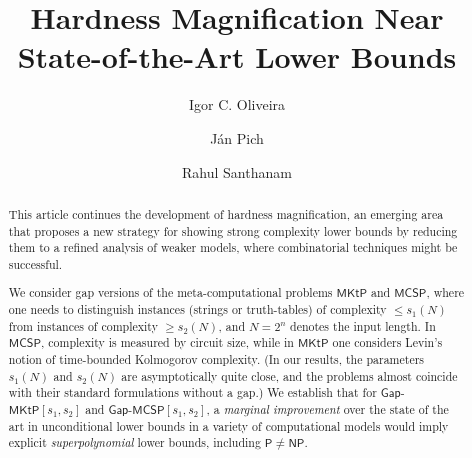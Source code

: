 \documentclass{toc}
\newcommand{\gapmktp}{\mathsf{Gap}$-$\mathsf{MKtP}}
\newcommand{\gapmcsp}{\mathsf{Gap}$-$\mathsf{MCSP}}
\begin{document}
\begin{frontmatter} %
  
%
%

%
%

  \title{Hardness Magnification Near State-of-the-Art Lower Bounds}

%
%
%
%
%
%
%
%
%
%
%
%


%
%
%
%

%

\author[oliveira]{Igor C. Oliveira}%
\author[pich]{J\'an Pich}%
\author[santhanam]{Rahul Santhanam}%


%
%
%
%

%
%
%
%
%
%


\begin{abstract}
%
%
This article continues the development of hardness magnification,
an emerging area that   %
proposes a new strategy for showing strong complexity lower bounds by reducing them to a refined analysis of weaker models, where combinatorial techniques might be successful. 

We consider gap versions of the meta-computational problems $\mathsf{MKtP}$ and $\mathsf{MCSP}$, where one needs to distinguish instances (strings or truth-tables) of complexity $\leq s_1(N)$ from instances of complexity $\geq s_2(N)$, and $N = 2^n$ denotes the input length. In $\mathsf{MCSP}$, complexity is measured by circuit size, while in $\mathsf{MKtP}$ one considers Levin's notion of time-bounded Kolmogorov complexity. (In our results, the parameters $s_1(N)$ and $s_2(N)$ are asymptotically quite close, and the problems almost coincide with their standard formulations without a gap.) We establish that for $\gapmktp[s_1,s_2]$ and $\gapmcsp[s_1,s_2]$, a \emph{marginal improvement} over the
%
%
state of the art  %
in unconditional lower bounds in a variety of computational models would imply explicit \emph{superpolynomial} lower bounds,
%
including $\mathsf{P}\neq \mathsf{NP}$.\\  %

\vspace{-0.1cm}


\end{abstract}
\end{frontmatter}
\end{document}
